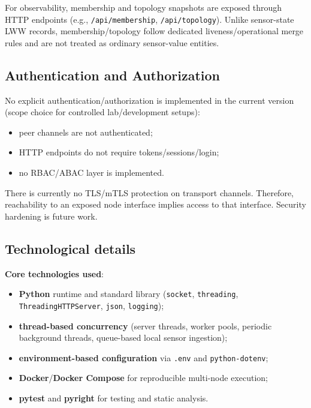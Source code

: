 For observability, membership and topology snapshots are exposed through HTTP endpoints (e.g., \texttt{/api/membership}, \texttt{/api/topology}). Unlike sensor-state LWW records, membership/topology follow dedicated liveness/operational merge rules and are not treated as ordinary sensor-value entities.

\subsection{Authentication and Authorization}
\label{implementation-auth}

No explicit authentication/authorization is implemented in the current version (scope choice for controlled lab/development setups):
\begin{itemize}
  \item peer channels are not authenticated;
  \item HTTP endpoints do not require tokens/sessions/login;
  \item no RBAC/ABAC layer is implemented.
\end{itemize}

There is currently no TLS/mTLS protection on transport channels. Therefore, reachability to an exposed node interface implies access to that interface. Security hardening is future work.

\subsection{Technological details}\label{technological-details}

\textbf{Core technologies used}:
\begin{itemize}
  \item \textbf{Python} runtime and standard library (\texttt{socket}, \texttt{threading}, \texttt{ThreadingHTTPServer}, \texttt{json}, \texttt{logging});
  \item \textbf{thread-based concurrency} (server threads, worker pools, periodic background threads, queue-based local sensor ingestion);
  \item \textbf{environment-based configuration} via \texttt{.env} and \texttt{python-dotenv};
  \item \textbf{Docker}/\textbf{Docker Compose} for reproducible multi-node execution;
  \item \textbf{pytest} and \textbf{pyright} for testing and static analysis.
\end{itemize}

